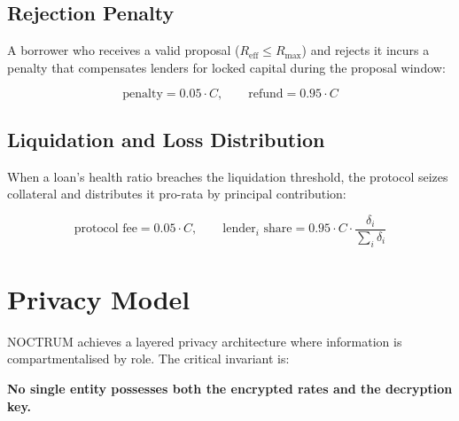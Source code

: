 \documentclass[a4paper,11pt]{article}
\begin{document}
\subsection{Rejection Penalty}

A borrower who receives a valid proposal ($R_{\text{eff}} \leq R_{\max}$)
and rejects it incurs a penalty that compensates lenders for locked capital
during the proposal window:

\begin{equation}
    \text{penalty} = 0.05 \cdot C, \qquad \text{refund} = 0.95 \cdot C
    \label{eq:penalty}
\end{equation}

\subsection{Liquidation and Loss Distribution}

When a loan's health ratio breaches the liquidation threshold, the protocol
seizes collateral and distributes it pro-rata by principal contribution:

\begin{equation}
    \text{protocol fee} = 0.05 \cdot C, \qquad
    \text{lender}_i\text{ share}
    = 0.95 \cdot C \cdot \frac{\delta_i}{\displaystyle\sum_i \delta_i}
    \label{eq:liquidation}
\end{equation}

\section{Privacy Model}

NOCTRUM achieves a layered privacy architecture where information is
compartmentalised by role. The critical invariant is:

\begin{tcolorbox}[colback=backcolour, colframe=gray, arc=2pt, boxrule=0.5pt]
\centering\small\bfseries
No single entity possesses both the encrypted rates and the decryption key.
\end{tcolorbox}
\end{document}
